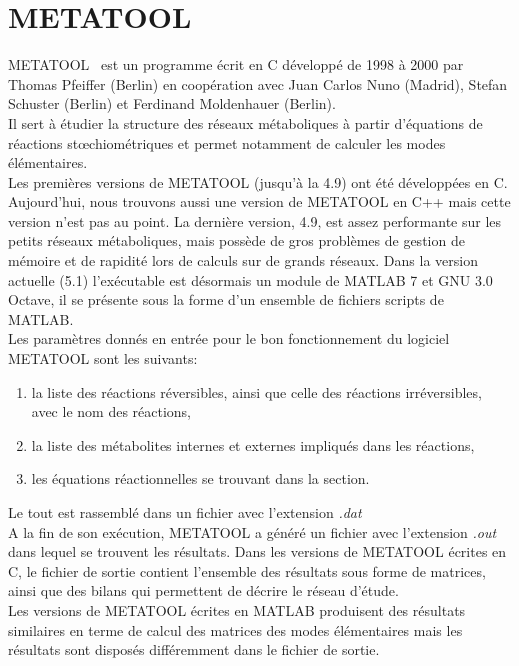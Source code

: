 \section{METATOOL} 
METATOOL~\cite{metatool:url} est un programme écrit en C développé de 1998 à 2000 par Thomas Pfeiffer (Berlin) en coopération avec Juan Carlos Nuno (Madrid), Stefan Schuster (Berlin) et Ferdinand Moldenhauer (Berlin).\\
Il sert à étudier la structure des réseaux métaboliques à partir d'équations de réactions stœchiométriques et permet notamment de calculer les modes élémentaires.\\
Les premières versions de METATOOL (jusqu'à la 4.9) ont été développées en C. Aujourd'hui, nous trouvons aussi une version de METATOOL en C++ mais cette version n'est pas au point. La dernière version, 4.9, est assez performante sur les petits réseaux métaboliques, mais possède de gros problèmes de gestion de mémoire et de rapidité lors de calculs sur de grands réseaux.
Dans la version actuelle (5.1) l'exécutable est désormais un module de MATLAB 7 et GNU 3.0 Octave, il se présente sous la forme d'un ensemble de fichiers scripts de MATLAB.\\

Les paramètres donnés en entrée pour le bon fonctionnement du logiciel METATOOL sont les suivants:
\begin{enumerate}
\item la liste des réactions réversibles, ainsi que celle des réactions irréversibles, avec le nom des réactions,
\item la liste des métabolites internes et externes impliqués dans les réactions,
\item les équations réactionnelles se trouvant dans la section.
\end{enumerate}
Le tout est rassemblé dans un fichier avec l'extension \textit{.dat}\\

A la fin de son exécution, METATOOL a généré un fichier avec l'extension \textit{.out} dans lequel se trouvent les résultats. Dans les versions de METATOOL écrites en C, le fichier de sortie contient l'ensemble des résultats sous forme de matrices, ainsi que des bilans qui permettent de décrire le réseau d'étude.\\
Les versions de METATOOL écrites en MATLAB produisent des résultats similaires en terme de calcul des matrices des modes élémentaires mais les résultats sont disposés différemment dans le fichier de sortie.

